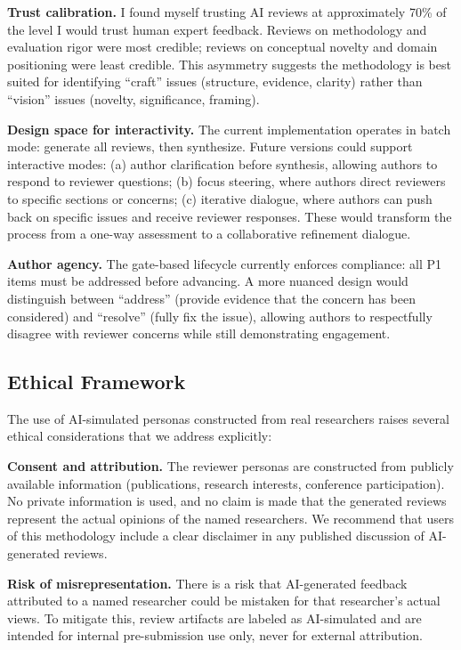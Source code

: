 \textbf{Trust calibration.} I found myself trusting AI reviews at approximately 70\% of the level I would trust human expert feedback. Reviews on methodology and evaluation rigor were most credible; reviews on conceptual novelty and domain positioning were least credible. This asymmetry suggests the methodology is best suited for identifying ``craft'' issues (structure, evidence, clarity) rather than ``vision'' issues (novelty, significance, framing).

\textbf{Design space for interactivity.} The current implementation operates in batch mode: generate all reviews, then synthesize. Future versions could support interactive modes: (a) author clarification before synthesis, allowing authors to respond to reviewer questions; (b) focus steering, where authors direct reviewers to specific sections or concerns; (c) iterative dialogue, where authors can push back on specific issues and receive reviewer responses. These would transform the process from a one-way assessment to a collaborative refinement dialogue.

\textbf{Author agency.} The gate-based lifecycle currently enforces compliance: all P1 items must be addressed before advancing. A more nuanced design would distinguish between ``address'' (provide evidence that the concern has been considered) and ``resolve'' (fully fix the issue), allowing authors to respectfully disagree with reviewer concerns while still demonstrating engagement.

\subsection{Ethical Framework}

The use of AI-simulated personas constructed from real researchers raises several ethical considerations that we address explicitly:

\textbf{Consent and attribution.} The reviewer personas are constructed from publicly available information (publications, research interests, conference participation). No private information is used, and no claim is made that the generated reviews represent the actual opinions of the named researchers. We recommend that users of this methodology include a clear disclaimer in any published discussion of AI-generated reviews.

\textbf{Risk of misrepresentation.} There is a risk that AI-generated feedback attributed to a named researcher could be mistaken for that researcher's actual views. To mitigate this, review artifacts are labeled as AI-simulated and are intended for internal pre-submission use only, never for external attribution.

